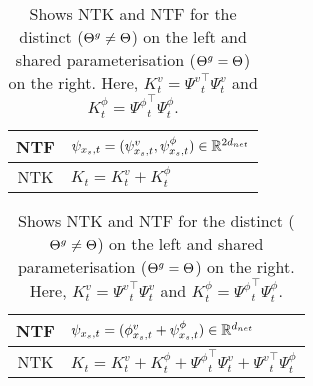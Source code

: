 \FloatBarrier
\begin{table}[h]
\begin{minipage}{0.5\columnwidth}
\begin{tabular}{|c|l|}\hline								 								 													
NTF		&$\psi_{x_s,t}=(\psi^v_{x_s,t},\psi^{\phi}_{x_s,t})\in\mathbb{R}^{2d_{net}}$\\\hline
NTK 		&$K_t=K^v_t+K^{\phi}_t$\\\hline
\end{tabular}
\end{minipage}
\begin{minipage}{0.5\columnwidth}
\begin{tabular}{|c|l|}\hline								 								 													
NTF		&$\psi_{x_s,t}=(\phi^v_{x_s,t}+\psi^{\phi}_{x_s,t})\in\mathbb{R}^{d_{net}}$\\\hline
NTK 		&$K_t=K^v_t+K^{\phi}_t+{\Psi^{\phi}}^\top_t\Psi^v_t+ {\Psi^{v}}^\top_t\Psi^{\phi}_t$\\\hline
\end{tabular}
\end{minipage}
\caption{Shows NTK and NTF for the distinct (${\Theta}^g\neq\Theta$) on the left and shared parameterisation (${\Theta}^g=\Theta$) on the right. Here, $K^v_t={\Psi^{v}}^\top_t\Psi^v_t$ and $K^{\phi}_t={\Psi^{\phi}}^\top_t\Psi^{\phi}_t$.}
\label{tb:ntks}
\end{table}

\begin{comment}
The \textbf{neural tangent feature} (NTF) is given by $\psi_{x_s,t}=(\psi^v_{x_s,t},\psi^{\phi}_{x_s,t})\in\R^{2d_{net}}$, when the gating network is parameterised by $\Tg$ which is distinct from $\Theta$. When the parameters are shared ($\Tg_t=\Theta_t\forall t\geq 0$), then we have $\psi_{x_s,t}=(\phi^v_{x_s,t}+\psi^{\phi}_{x_s,t})\in\R^{d_{net}}$.\\
When the gating network is parameterised by $\Tg$ which is distinct from $\Theta$, the \textbf{neural tangent kernel} (NTK) matrix is given by $K_t=K^v_t+K^{\phi}_t$, where $K^v_t={\Psi^{v}}^\top_t\Psi^v_t$ and $K^{\phi}_t={\Psi^{\phi}}^\top_t\Psi^{\phi}_t$, with $\Psi^v_t=(\psi^v_{x_s,t},s\in[n])\in\R^{d_{net}\times n}$ and $\Psi^{\phi}_t=(\psi^{\phi}_{x_s,t},s\in[n])\in\R^{d_{net}\times n}$. In the case of shared parameterisation ($\Tg_t=\Theta_t\forall t\geq 0$), we have $K_t=K^v_t+K^{\phi}_t+{\Psi^{\phi}}^\top_t\Psi^v_t+ {\Psi^{v}}^\top_t\Psi^{\phi}_t$.
\end{comment}